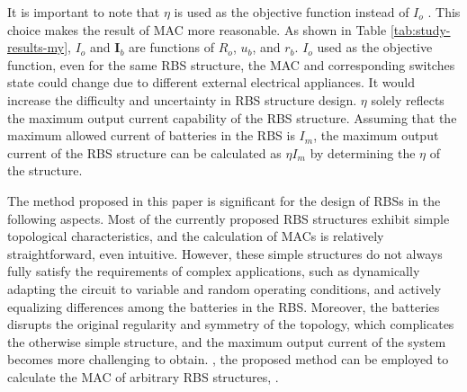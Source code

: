 \documentclass{article}
\begin{document}
It is important to note that  $\eta$ is used as the objective function instead of $I_o$ . 
This choice makes the result of MAC more reasonable. 
As shown in Table \ref{tab:study-results-my}, $I_o$ and $\bm{I}_b$ are functions of $R_o$, $u_b$, and $r_b$. 
 $I_o$  used as the objective function, even for the same RBS structure, the MAC  and corresponding switches state could change due to different external electrical appliances.
It would increase the difficulty and uncertainty in RBS structure design. 
$\eta$ solely reflects the maximum output current capability of the RBS structure. 
Assuming that the maximum allowed current of batteries in the RBS is $I_m$, the maximum output current of the RBS structure can be calculated as $\eta I_m$ by determining the $\eta$ of the structure. 


The method proposed in this paper is significant for the design of  RBSs in the following aspects.
Most of the currently proposed RBS structures\cite{ciNovelDesignAdaptive2007,alahmadBatterySwitchArray2008,kimDependableEfficientScalable2010b,kimBalancedReconfigurationStorage2011a,taesickimSeriesconnectedSelfreconfigurableMulticell2012a,6843711} exhibit simple topological characteristics, and the calculation of MACs is relatively straightforward, even intuitive.
However, these simple structures do not always fully satisfy the requirements of complex applications, such as dynamically adapting the circuit to variable and random operating conditions, and actively equalizing differences among the batteries in the RBS.
Moreover,  the batteries disrupts the original regularity and symmetry of the topology, which complicates the otherwise simple structure, and the maximum output current of the system becomes more challenging to obtain.
, the proposed method can be employed to calculate the MAC of arbitrary RBS structures, .
\end{document}
